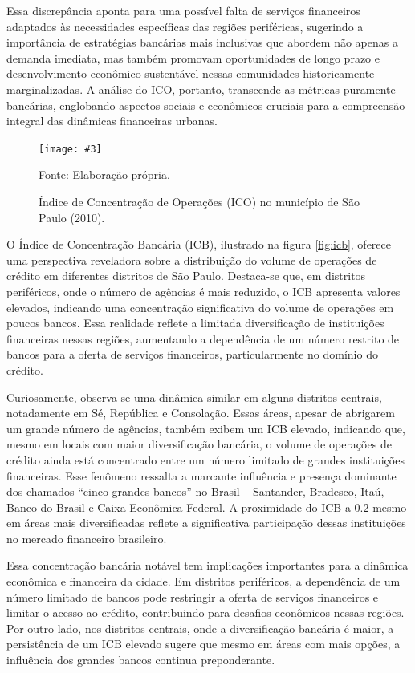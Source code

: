 \documentclass[a4paper,12pt]{article}
\newcommand{\fig}[4]{%
  \begin{figure}[H]
    \centering
    \caption{#1}
    \label{#2}
    \texttt{[image: \#3]}
    
    \vspace{0.5cm}
    
    \begin{footnotesize}
      Fonte: #4
    \end{footnotesize}
  \end{figure}
}
\begin{document}
Essa discrepância aponta para uma possível falta de serviços financeiros
adaptados às necessidades específicas das regiões periféricas, sugerindo
a importância de estratégias bancárias mais inclusivas que abordem não
apenas a demanda imediata, mas também promovam oportunidades de longo
prazo e desenvolvimento econômico sustentável nessas comunidades
historicamente marginalizadas. A análise do ICO, portanto, transcende as
métricas puramente bancárias, englobando aspectos sociais e econômicos
cruciais para a compreensão integral das dinâmicas financeiras urbanas.

\fig{Índice de Concentração de Operações (ICO) no município de São Paulo (2010).}{fig:ico}{exports/ico2.pdf}{Elaboração própria.}

O Índice de Concentração Bancária (ICB), ilustrado na figura
\ref{fig:icb}, oferece uma perspectiva reveladora sobre a distribuição
do volume de operações de crédito em diferentes distritos de São Paulo.
Destaca-se que, em distritos periféricos, onde o número de agências é
mais reduzido, o ICB apresenta valores elevados, indicando uma
concentração significativa do volume de operações em poucos bancos. Essa
realidade reflete a limitada diversificação de instituições financeiras
nessas regiões, aumentando a dependência de um número restrito de bancos
para a oferta de serviços financeiros, particularmente no domínio do
crédito.

Curiosamente, observa-se uma dinâmica similar em alguns distritos
centrais, notadamente em Sé, República e Consolação. Essas áreas, apesar
de abrigarem um grande número de agências, também exibem um ICB elevado,
indicando que, mesmo em locais com maior diversificação bancária, o
volume de operações de crédito ainda está concentrado entre um número
limitado de grandes instituições financeiras. Esse fenômeno ressalta a
marcante influência e presença dominante dos chamados ``cinco grandes
bancos'' no Brasil -- Santander, Bradesco, Itaú, Banco do Brasil e Caixa
Econômica Federal. A proximidade do ICB a \(0.2\) mesmo em áreas mais
diversificadas reflete a significativa participação dessas instituições
no mercado financeiro brasileiro.

Essa concentração bancária notável tem implicações importantes para a
dinâmica econômica e financeira da cidade. Em distritos periféricos, a
dependência de um número limitado de bancos pode restringir a oferta de
serviços financeiros e limitar o acesso ao crédito, contribuindo para
desafios econômicos nessas regiões. Por outro lado, nos distritos
centrais, onde a diversificação bancária é maior, a persistência de um
ICB elevado sugere que mesmo em áreas com mais opções, a influência dos
grandes bancos continua preponderante.
\end{document}
